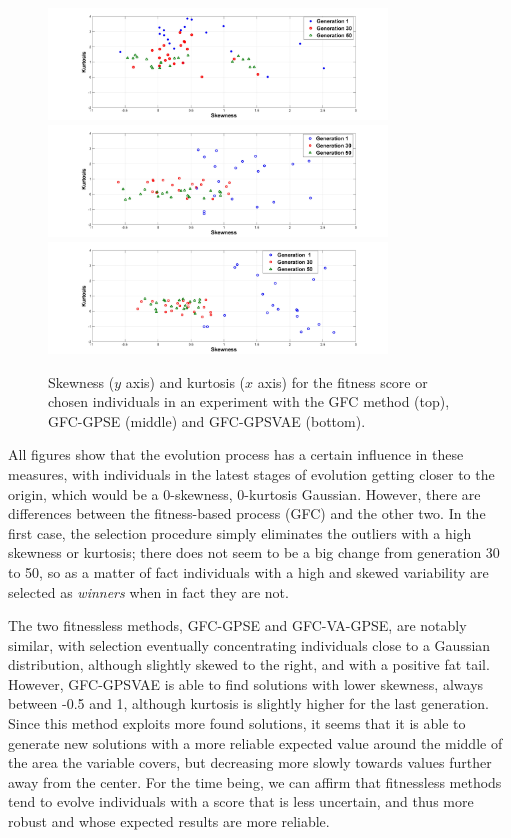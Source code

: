 \documentclass[10pt,journal,compsoc]{IEEEtran}
\begin{document}
\begin{figure}[!ht]	
	\begin{center}
          \includegraphics[width=9cm]{fig/GFC__.jpg}
          \includegraphics[width=9cm]{fig/GFCRSE__.jpg}
          \includegraphics[width=9cm]{fig/GFCVARSE__.jpg}
		\caption{Skewness ($y$ axis) and kurtosis ($x$ axis)
                  for the fitness score or chosen individuals in an experiment with the
                  {\sf GFC} method \cite{salem_cig2018} (top), {\sf GFC-GPSE} (middle) and {\sf GFC-GPSVAE} (bottom).}
		\label{fig:gfcsk} \label{fig:gfcrsesk} \label{fig:gfcvarsesk}			
	\end{center}	
\end{figure}

All figures show that the evolution process has a certain influence in
these measures, with individuals in the latest stages of evolution
getting closer to the origin, which would be a 0-skewness, 0-kurtosis
Gaussian. However, there are differences between the fitness-based
process ({\sf GFC}) and the other two. In the first case, the
selection procedure simply eliminates the outliers with a high
skewness or kurtosis; there does not seem to be a big change from
generation 30 to 50, so as a matter of fact individuals with a high
and skewed variability are selected as {\em winners} when in fact they
are not.

The two fitnessless methods, {\sf GFC-GPSE} and {\sf GFC-VA-GPSE}, are
notably similar, with selection eventually concentrating individuals
close to a Gaussian distribution, although slightly skewed to the
right, and with a positive fat tail. However, {\sf GFC-GPSVAE} is able
to find solutions with lower skewness, always between -0.5 and 1,
although kurtosis is slightly higher for the last generation. Since
this method exploits more found solutions, it seems that it is able to
generate new solutions with a more reliable expected value around the
middle of the area the variable covers, but decreasing more slowly
towards values further away from the center. For the time being,
we can affirm that fitnessless methods tend to evolve individuals
with a score that is less uncertain, and thus more robust and whose
expected results are more reliable.
\end{document}
